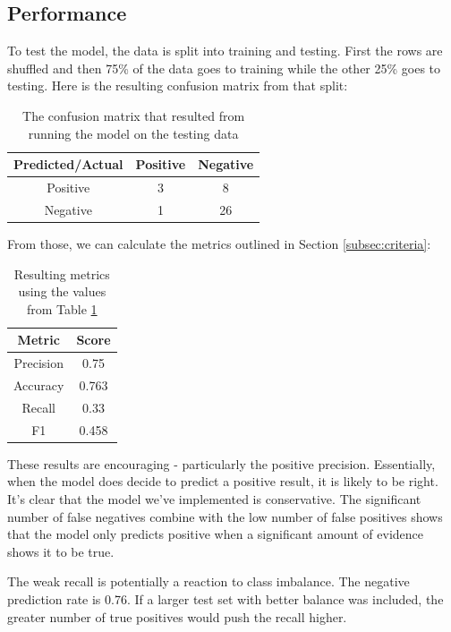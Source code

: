 \documentclass[11pt, twoside, reqno]{book}
\begin{document}
\subsection{Performance}
\hspace{0.2in} To test the model, the data is split into training and testing. First the rows are shuffled and then 75\% of the data goes to training while the other 25\% goes to testing. Here is the resulting confusion matrix from that split:
\begin{table}[H]
\centering
\begin{tabular}{|c|c|c|}
	\hline
	Predicted/Actual & Positive & Negative \\
	\hline
	Positive & 3 & 8 \\
	\hline
	Negative & 1 &  26\\
	\hline
\end{tabular}
\caption{The confusion matrix that resulted from running the model on the testing data}\label{fig:out_confusion_matrix}
\end{table}
From those, we can calculate the metrics outlined in Section \ref{subsec:criteria}:
\begin{table}[H]
\centering
\begin{tabular}{|c|c|}
	\hline
	Metric & Score \\
	\hline
	Precision & 0.75 \\
	\hline
	Accuracy & 0.763\\
	\hline
	Recall & 0.33 \\
	\hline
	F1 & 0.458 \\
	\hline
\end{tabular}
\caption{Resulting metrics using the values from Table \ref{fig:out_confusion_matrix}}\label{fig:metrics}
\end{table}

These results are encouraging - particularly the positive precision. Essentially, when the model does decide to predict a positive result, it is likely to be right. It's clear that the model we've implemented is conservative. The significant number of false negatives combine with the low number of false positives shows that the model only predicts positive when a significant amount of evidence shows it to be true. 

The weak recall is potentially a reaction to class imbalance. The negative prediction rate is 0.76. If a larger test set with better balance was included, the greater number of true positives would push the recall higher. 

\end{document}
